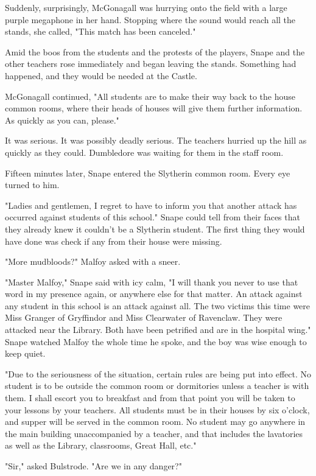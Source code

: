 \documentclass[a4paper,11pt]{article}
\begin{document}
Suddenly, surprisingly, McGonagall was hurrying onto the field with a large purple megaphone in her hand. Stopping where the sound would reach all the stands, she called, "This match has been canceled."

Amid the boos from the students and the protests of the players, Snape and the other teachers rose immediately and began leaving the stands. Something had happened, and they would be needed at the Castle.

McGonagall continued, "All students are to make their way back to the house common rooms, where their heads of houses will give them further information. As quickly as you can, please."

It was serious. It was possibly deadly serious. The teachers hurried up the hill as quickly as they could. Dumbledore was waiting for them in the staff room.

Fifteen minutes later, Snape entered the Slytherin common room. Every eye turned to him.

"Ladies and gentlemen, I regret to have to inform you that another attack has occurred against students of this school." Snape could tell from their faces that they already knew it couldn't be a Slytherin student. The first thing they would have done was check if any from their house were missing.

"More mudbloods?" Malfoy asked with a sneer.

"Master Malfoy," Snape said with icy calm, "I will thank you never to use that word in my presence again, or anywhere else for that matter. An attack against any student in this school is an attack against all. The two victims this time were Miss Granger of Gryffindor and Miss Clearwater of Ravenclaw. They were attacked near the Library. Both have been petrified and are in the hospital wing." Snape watched Malfoy the whole time he spoke, and the boy was wise enough to keep quiet.

"Due to the seriousness of the situation, certain rules are being put into effect. No student is to be outside the common room or dormitories unless a teacher is with them. I shall escort you to breakfast and from that point you will be taken to your lessons by your teachers. All students must be in their houses by six o'clock, and supper will be served in the common room. No student may go anywhere in the main building unaccompanied by a teacher, and that includes the lavatories as well as the Library, classrooms, Great Hall, etc."

"Sir," asked Bulstrode. "Are we in any danger?"
\end{document}
